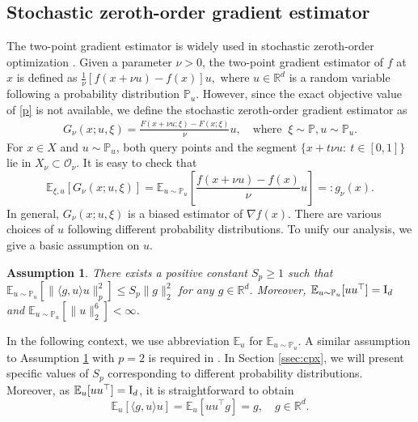 \documentclass[11pt]{article}
\newtheorem{assumption}{Assumption}[section]
\newtheorem{remark}{Remark}[section]
\numberwithin{equation}{section}
\newcommand{\R}{\mathbb{R}}
\newcommand{\E}{\mathbb{E}}
\begin{document}
\subsection{Stochastic zeroth-order gradient estimator}\label{ssec:ge}  
The two-point gradient estimator is widely used in  stochastic zeroth-order optimization \cite{duchi2015optimal,sgd,Nesterov17}. Given a parameter $\nu>0$, the two-point gradient estimator of $f$ at $x$ is defined as $\frac{1}{\nu}[f(x+\nu u)-f(x)] u,$
where  $u \in \R^d$ is a random variable following a probability distribution $\mathbb P_u$.
However, since the exact objective value of \eqref{p} is not available, we define the stochastic zeroth-order gradient estimator as
\begin{equation}\label{sgrad}
    \begin{aligned}
    G_\nu(x;u,\xi) = \frac{F(x+\nu u;\xi)-F(x;\xi)}{\nu} u, \quad\mbox{where }\ \xi\sim \mathbb P,  u\sim \mathbb P_u.
\end{aligned}\end{equation}
For $x\in X$ and $u\sim\mathbb P_u$, both query points and the segment
$\{x+t\nu u:\ t\in[0,1]\}$ lie in $X_\nu\subset\mathcal O_\nu$.
It is easy to check that 
\begin{equation*}
\E_{\xi,u}[G_\nu(x;u,\xi)]=\E_{u\sim \mathbb P_u} [\frac{f(x+\nu u)-f(x)}{\nu} u]=: g_\nu (x).
\end{equation*}
In general, $G_\nu(x;u,\xi)$ is a biased estimator of $\nabla f(x)$. %
There are various choices of $u$ following different probability distributions. To unify our  analysis, we give a basic assumption on $u$.

\begin{assumption}\label{ass:exs}
    There exists a positive constant $S_p \ge 1$ such that 
    $\E_{u\sim \mathbb P_u} [\|\langle g , u \rangle u\|_p^2] \leq S_p \|g\|_2^2 $ for any $g \in \R^d
    $. Moreover,  $\E_{u\sim \mathbb P_u} [uu^\top] = {\rm I}_d$ and \(\E_{u\sim \mathbb P_u}[\|u\|_2^6]<\infty\).
\end{assumption}

In the following context, we use abbreviation $\E_{u}$ for $\E_{u\sim \mathbb P_u}$. 
A similar assumption to Assumption \ref{ass:exs} with $p=2$ is required in \cite{duchi2015optimal}.  
In Section \ref{ssec:cpx}, we will present  specific values of $S_p$ corresponding to different probability distributions. Moreover, as $\E_u[u u^\top]={\rm I}_d$, it is straightforward to obtain 
    \begin{equation}\label{le:u1}
    \E_u[\langle g,u\rangle u] = \E_u[uu^\top g] = g,\quad g\in\R^d.
    \end{equation}
\end{document}
